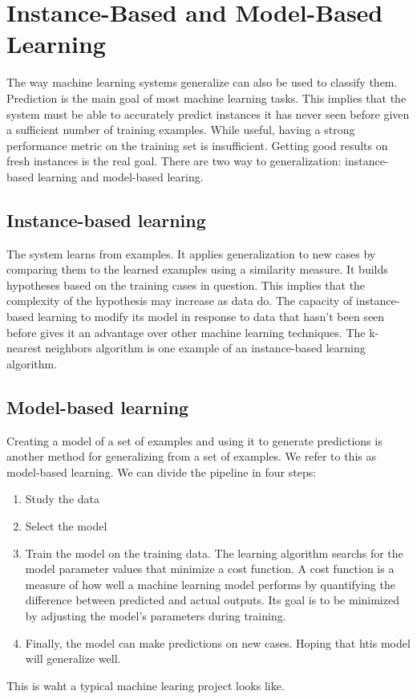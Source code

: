 \section{Instance-Based and Model-Based Learning}
The way machine learning systems generalize can also be used to classify them. Prediction is the main goal of most machine learning tasks.
This implies that the system must be able to accurately predict instances it has never seen before given a sufficient number of training examples. 
While useful, having a strong performance metric on the training set is insufficient. Getting good results on fresh instances is the real goal. 
There are two way to generalization: instance-based learning and model-based learing. 

\subsection{Instance-based learning}
The system learns from examples. It applies generalization to new cases by comparing them to the learned examples using a similarity measure. 
It builds hypotheses based on the training cases in question. This implies that the complexity of the hypothesis may increase as data do. 
The capacity of instance-based learning to modify its model in response to data that hasn't been seen before gives it an advantage over other machine learning techniques. 
The k-nearest neighbors algorithm is one example of an instance-based learning algorithm.

\subsection{Model-based learning}
Creating a model of a set of examples and using it to generate predictions is another method for generalizing from a set of examples. We refer to this as model-based learning.
We can divide the pipeline in four steps: 
\begin{enumerate}
    \item Study the data
    \item Select the model
    \item Train the model on the training data. The learning algorithm searchs for the model parameter values that minimize a cost function. 
    A cost function is a measure of how well a machine learning model performs by quantifying the difference between predicted and actual outputs. Its goal is to be minimized by adjusting the model's parameters during training.
    \item Finally, the model can make predictions on new cases. Hoping that htis model will generalize well.
\end{enumerate}

This is waht a typical machine learing project looks like.